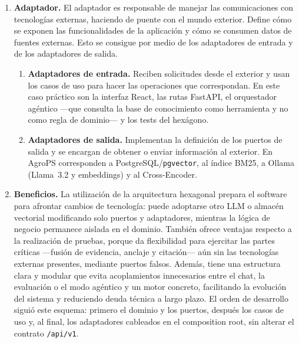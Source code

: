 \begin{enumerate}[leftmargin=*, itemsep=0.85em, label=\textbf{\arabic*.}]
\begin{enumerate}[leftmargin=*, itemsep=0.65em, label=\textbf{\arabic{enumi}.\arabic*.}]
          \item \textbf{Puertos de salida.}
                Se trata de interfaces que definen qué datos necesita el sistema desde el exterior, sin llegar a definir cómo obtenerlos. En AgroPS declaran la necesidad de vectores, de generación de texto, de un índice léxico y de reordenación, sin nombrar PostgreSQL, Ollama, BM25 ni el Cross-Encoder.
        \end{enumerate}

  \item \textbf{Adaptador.}
        El adaptador es responsable de manejar las comunicaciones con tecnologías externas, haciendo de puente con el mundo exterior. Define cómo se exponen las funcionalidades de la aplicación y cómo se consumen datos de fuentes externas. Esto se consigue por medio de los adaptadores de entrada y de los adaptadores de salida.

        \begin{enumerate}[leftmargin=*, itemsep=0.65em, label=\textbf{\arabic{enumi}.\arabic*.}]
          \item \textbf{Adaptadores de entrada.}
                Reciben solicitudes desde el exterior y usan los casos de uso para hacer las operaciones que correspondan. En este caso práctico son la interfaz React, las rutas FastAPI, el orquestador agéntico ---que consulta la base de conocimiento como herramienta y no como regla de dominio--- y los tests del hexágono.

          \item \textbf{Adaptadores de salida.}
                Implementan la definición de los puertos de salida y se encargan de obtener o enviar información al exterior. En AgroPS corresponden a PostgreSQL/\texttt{pgvector}, al índice BM25, a Ollama (Llama~3.2 y embeddings) y al Cross-Encoder.
        \end{enumerate}

  \item \textbf{Beneficios.}
        La utilización de la arquitectura hexagonal prepara el software para afrontar cambios de tecnología: puede adoptarse otro LLM o almacén vectorial modificando solo puertos y adaptadores, mientras la lógica de negocio permanece aislada en el dominio. También ofrece ventajas respecto a la realización de pruebas, porque da flexibilidad para ejercitar las partes críticas ---fusión de evidencia, anclaje y citación--- aún sin las tecnologías externas presentes, mediante puertos falsos. Además, tiene una estructura clara y modular que evita acoplamientos innecesarios entre el chat, la evaluación o el modo agéntico y un motor concreto, facilitando la evolución del sistema y reduciendo deuda técnica a largo plazo. El orden de desarrollo siguió este esquema: primero el dominio y los puertos, después los casos de uso y, al final, los adaptadores cableados en el composition root, sin alterar el contrato \texttt{/api/v1}.
\end{enumerate}

